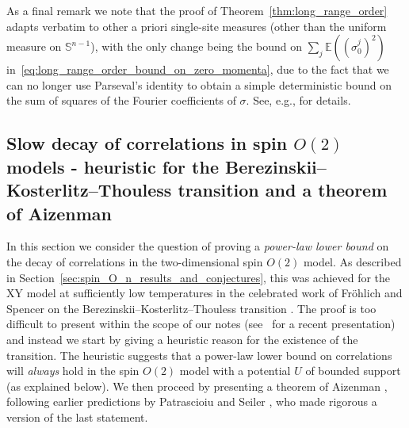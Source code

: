 \documentclass[12pt,reqno]{article}
\def\E{\mathbb{E}}
\renewcommand{\S}{\mathbb{S}}
\begin{document}
\medskip
As a final remark we note that the proof of Theorem~\ref{thm:long_range_order} adapts verbatim to other a priori single-site measures (other than the uniform measure on $\S^{n-1}$), with the only change being the bound on $\sum_j \E((\hat{\sigma}^j_0)^2)$ in~\eqref{eq:long_range_order_bound_on_zero_momenta}, due to the fact that we can no longer use Parseval's identity to obtain a simple deterministic bound on the sum of squares of the Fourier coefficients of $\sigma$. See, e.g., \cite[Section 3.2]{Bauerschmidt2016} for details.



\subsection{Slow decay of correlations in spin $O(2)$ models - heuristic for the Berezinskii--Kosterlitz--Thouless transition and a theorem of Aizenman}\label{sec:Berezinskii-Kosterlitz-Thouless}
In this section we consider the question of proving a
\emph{power-law lower bound} on the decay of correlations in the
two-dimensional spin $O(2)$ model. As described in
Section~\ref{sec:spin_O_n_results_and_conjectures}, this was
achieved for the XY model at sufficiently low temperatures in the
celebrated work of Fr\"ohlich and Spencer on the
Berezinskii--Kosterlitz--Thouless transition \cite{FroSpe81}. The proof is too
difficult to present within the scope of our notes (see~\cite{kharash2017fr} for a recent presentation) and instead we
start by giving a heuristic reason for the existence of the
transition. The heuristic suggests that a power-law lower bound on
correlations will \emph{always} hold in the spin $O(2)$ model with a
potential $U$ of bounded support (as explained below). We then
proceed by presenting a theorem of Aizenman \cite{Aiz94}, following
earlier predictions by Patrascioiu and Seiler \cite{PatSei92}, who
made rigorous a version of the last statement.
\end{document}

